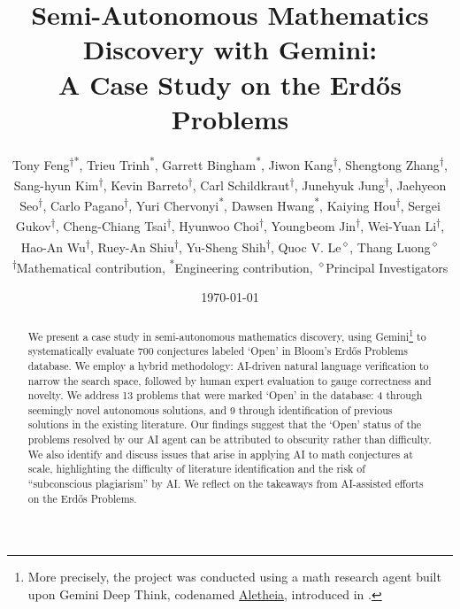 \documentclass{article}
\title{Semi-Autonomous Mathematics Discovery with Gemini:\\ A Case Study on the Erd\H{o}s Problems}
\author{
Tony Feng\textsuperscript{$\dagger$*}, 
Trieu Trinh\textsuperscript{*}, 
Garrett Bingham\textsuperscript{*}, 
Jiwon Kang\textsuperscript{$\dagger$}, 
Shengtong Zhang\textsuperscript{$\dagger$}, 
Sang-hyun Kim\textsuperscript{$\dagger$}, 
Kevin Barreto\textsuperscript{$\dagger$}, 
Carl Schildkraut\textsuperscript{$\dagger$}, 
Junehyuk Jung\textsuperscript{$\dagger$}, 
Jaehyeon Seo\textsuperscript{$\dagger$}, 
Carlo Pagano\textsuperscript{$\dagger$}, 
Yuri Chervonyi\textsuperscript{*}, 
Dawsen Hwang\textsuperscript{*}, 
Kaiying Hou\textsuperscript{$\dagger$}, 
Sergei Gukov\textsuperscript{$\dagger$}, 
Cheng-Chiang Tsai\textsuperscript{$\dagger$}, 
Hyunwoo Choi\textsuperscript{$\dagger$}, 
Youngbeom Jin\textsuperscript{$\dagger$}, 
Wei-Yuan Li\textsuperscript{$\dagger$}, 
Hao-An Wu\textsuperscript{$\dagger$}, 
Ruey-An Shiu\textsuperscript{$\dagger$}, 
Yu-Sheng Shih\textsuperscript{$\dagger$},
Quoc V. Le\textsuperscript{$\diamond$}, Thang Luong\textsuperscript{$\diamond$} \\

\small \textsuperscript{$\dagger$}Mathematical contribution, \textsuperscript{*}Engineering contribution, \textsuperscript{$\diamond$}Principal Investigators \newline
}
\date{\today}
\theoremstyle{plain}
\theoremstyle{definition}
\begin{document}
\maketitle

\insert{}


\begin{abstract}
    We present a case study in semi-autonomous mathematics discovery, using Gemini\footnote{More precisely, the project was conducted using a math research agent built upon Gemini Deep Think, codenamed {\color{blue}\href{https://github.com/google-deepmind/superhuman/tree/main/aletheia}{Aletheia}}, introduced in \cite{aletheia}.} to systematically evaluate 700 conjectures labeled `Open' in Bloom's Erd\H{o}s Problems database. We employ a hybrid methodology: AI-driven natural language verification to narrow the search space, followed by human expert evaluation to gauge correctness and novelty. We address 13 problems that were marked `Open' in the database: 4 through seemingly novel autonomous solutions, and 9 through identification of previous solutions in the existing literature. Our findings suggest that the `Open' status of the problems resolved by our AI agent can be attributed to obscurity rather than difficulty. We also identify and discuss issues that arise in applying AI to math conjectures at scale, highlighting the difficulty of literature identification and the risk of ``subconscious plagiarism'' by AI. We reflect on the takeaways from AI-assisted efforts on the Erd\H{o}s Problems.
\end{abstract}

\tableofcontents
\end{document}
